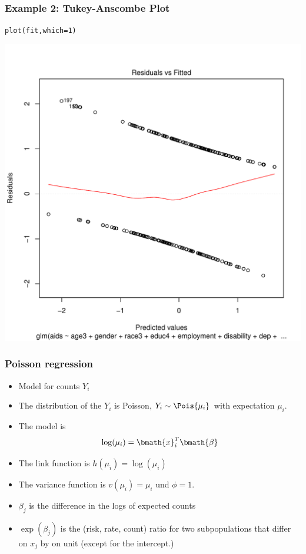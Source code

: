 \documentclass[extsize,handout,10pt]{beamer}\usepackage[]{graphicx}\usepackage[]{color}
\makeatletter
\newcommand{\hlnum}[1]{\textcolor[rgb]{0.502,0.086,1}{#1}}%
\newcommand{\hlstd}[1]{\textcolor[rgb]{0.251,0.251,0.251}{#1}}%
\newcommand{\hlkwc}[1]{\textcolor[rgb]{0.188,0.941,0.314}{#1}}%
\newcommand{\hlkwd}[1]{\textcolor[rgb]{0.69,0.188,0.941}{#1}}%
\newenvironment{kframe}{%
 \def\at@end@of@kframe{}%
 \ifinner\ifhmode%
  \def\at@end@of@kframe{\end{minipage}}%
  \begin{minipage}{\columnwidth}%
 \fi\fi%
 \def\FrameCommand##1{\hskip\@totalleftmargin \hskip-\fboxsep
 \colorbox{shadecolor}{##1}\hskip-\fboxsep
     \hskip-\linewidth \hskip-\@totalleftmargin \hskip\columnwidth}%
 \MakeFramed {\advance\hsize-\width
   \@totalleftmargin\z@ \linewidth\hsize
   \@setminipage}}%
 {\par\unskip\endMakeFramed%
 \at@end@of@kframe}
\newenvironment{knitrout}{}{} %
\makeatother
\begin{document}
\begin{frame}[fragile]
  \frametitle{Example 2: Tukey-Anscombe Plot} 

\begin{knitrout}\tiny
{}\color{fgcolor}\begin{kframe}
\begin{alltt}
\hlkwd{plot}\hlstd{(fit,}\hlkwc{which}\hlstd{=}\hlnum{1}\hlstd{)}
\end{alltt}
\end{kframe}

{\centering \includegraphics[width=.49\linewidth]{figures/GesWiss2unnamed-chunk-17-1} 

}



\end{knitrout}
 

\end{frame}



















\begin{frame}
  \frametitle{Poisson regression}
  \begin{itemize}
  \item Model for counts $Y_i$
  \item The distribution of the $Y_i$ is Poisson, $Y_i \sim \Pois{\mu_i}$ with expectation $\mu_i$.
  \item The model is
  \begin{equation}
  \label{eq:4}
  \log(\mu_i)=\bmath{x}^T_i\bmath{\beta}
  \end{equation}
  \item The link function is $h(\mu_i)=\log(\mu_i)$
                                            \item The variance
  function is $v(\mu_i)=\mu_i$ und $\phi=1$.
  \item $\beta_j$ is the difference in the logs of expected counts 
  \item $\exp(\beta_j)$ is the (risk, rate, count) ratio for two
  subpopulations that differ on $x_j$ by on unit (except for the
                                                  intercept.)
\end{itemize}
\end{frame}
\end{document}

